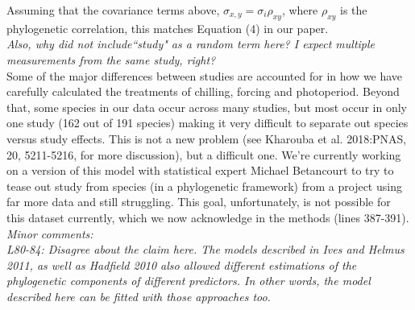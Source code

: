 \documentclass[11pt]{article}
\begin{document}
Assuming that the covariance terms above, $\sigma_{x,y}=\sigma_i \rho_{xy}$, where $\rho_{xy}$ is the phylogenetic correlation, this matches Equation (4) in our paper.\\

\emph{Also, why did not include``study" as a random term here? I expect multiple measurements from the same study, right?}\\

Some of the major differences between studies are accounted for in how we have carefully calculated the treatments of chilling, forcing and photoperiod. Beyond that, some species in our data occur across many studies, but most occur in only one study (162 out of 191 species) making it very difficult to separate out species versus study effects. This is not a new problem (see Kharouba et al. 2018:PNAS, 20, 5211-5216, for more discussion), but a difficult one. We're currently working on a version of this model with statistical expert Michael Betancourt to try to tease out study from species (in a phylogenetic framework) from a project using far more data and still struggling. This goal, unfortunately, is not possible for this dataset currently, which we now acknowledge in the methods (lines 387-391). \\ %



\emph{Minor comments:}\\
\emph{L80-84: Disagree about the claim here. The models described in Ives and Helmus 2011, as well as Hadfield 2010 also allowed different estimations of the phylogenetic components of different predictors. In other words, the model described here can be fitted with those approaches too.}\\ %
\end{document}
